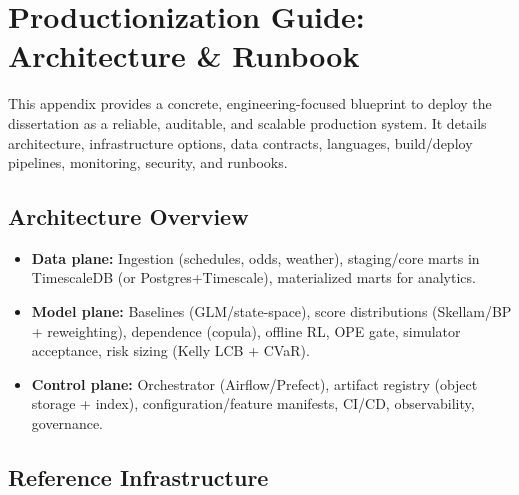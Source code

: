 \chapter[Productionization Guide]{Productionization Guide: Architecture \& Runbook}
\label{app:prod-guide}

This appendix provides a concrete, engineering-focused blueprint to deploy the dissertation as a reliable, auditable, and scalable production system. It details architecture, infrastructure options, data contracts, languages, build/deploy pipelines, monitoring, security, and runbooks.

\section{Architecture Overview}
\begin{itemize}
  \item \textbf{Data plane:} Ingestion (schedules, odds, weather), staging/core marts in TimescaleDB (or Postgres+Timescale), materialized marts for analytics.
  \item \textbf{Model plane:} Baselines (GLM/state-space), score distributions (Skellam/BP + reweighting), dependence (copula), offline RL, OPE gate, simulator acceptance, risk sizing (Kelly LCB + CVaR).
  \item \textbf{Control plane:} Orchestrator (Airflow/Prefect), artifact registry (object storage + index), configuration/feature manifests, CI/CD, observability, governance.
\end{itemize}

\section{Reference Infrastructure}
